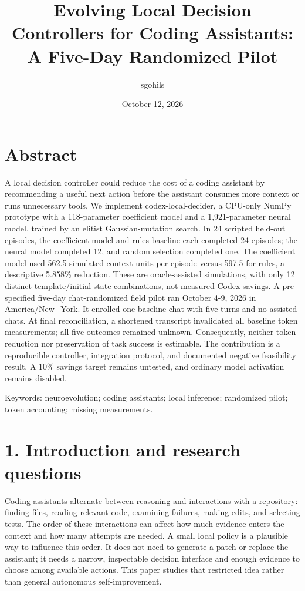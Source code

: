 \documentclass[11pt]{article}
\title{Evolving Local Decision Controllers for Coding Assistants: A Five-Day Randomized Pilot}
\author{sgohils}
\date{October 12, 2026}
\begin{document}
\maketitle
\section*{Abstract}
A local decision controller could reduce the cost of a coding assistant by recommending a useful next action before the assistant consumes more context or runs unnecessary tools. We implement codex-local-decider, a CPU-only NumPy prototype with a 118-parameter coefficient model and a 1,921-parameter neural model, trained by an elitist Gaussian-mutation search. In 24 scripted held-out episodes, the coefficient model and rules baseline each completed 24 episodes; the neural model completed 12, and random selection completed one. The coefficient model used 562.5 simulated context units per episode versus 597.5 for rules, a descriptive 5.858\% reduction. These are oracle-assisted simulations, with only 12 distinct template/initial-state combinations, not measured Codex savings. A pre-specified five-day chat-randomized field pilot ran October 4-9, 2026 in America/New\_York. It enrolled one baseline chat with five turns and no assisted chats. At final reconciliation, a shortened transcript invalidated all baseline token measurements; all five outcomes remained unknown. Consequently, neither token reduction nor preservation of task success is estimable. The contribution is a reproducible controller, integration protocol, and documented negative feasibility result. A 10\% savings target remains untested, and ordinary model activation remains disabled.

Keywords: neuroevolution; coding assistants; local inference; randomized pilot; token accounting; missing measurements.

\section*{1. Introduction and research questions}
Coding assistants alternate between reasoning and interactions with a repository: finding files, reading relevant code, examining failures, making edits, and selecting tests. The order of these interactions can affect how much evidence enters the context and how many attempts are needed. A small local policy is a plausible way to influence this order. It does not need to generate a patch or replace the assistant; it needs a narrow, inspectable decision interface and enough evidence to choose among available actions. This paper studies that restricted idea rather than general autonomous self-improvement.
\end{document}
